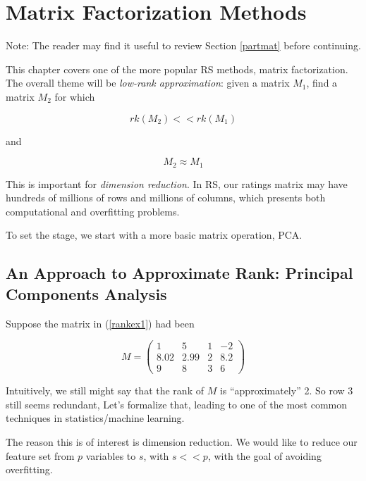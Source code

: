 
\chapter{Matrix Factorization Methods}   

Note:  The reader may find it useful to review Section \ref{partmat}
before continuing.

This chapter covers one of the more popular RS methods, matrix
factorization.  The overall theme will be \textit{low-rank
approximation}:  given a matrix $M_1$,  find a matrix $M_2$ for which 

\begin{equation}
rk(M_2) << rk(M_1)
\end{equation}

and 

\begin{equation}
M_2 \approx M_1
\end{equation}

This is important for \textit{dimension reduction}.  In RS, our
ratings matrix may have hundreds of millions of rows and millions of
columns, which presents both computational and overfitting problems.

To set the stage, we start with a more basic matrix operation, PCA.

\section{An Approach to Approximate Rank:  Principal Components
Analysis}

Suppose the matrix in (\ref{rankex1}) had been

\begin{equation}
\label{rankex2}  
M =
\left (
\begin{array}{rrrr}
1 & 5 & 1 & -2\\
8.02 & 2.99 & 2 & 8.2\\
9 & 8 & 3 & 6 
\end{array}
\right )
\end{equation}

Intuitively, we still might say that the rank of $M$ is
``approximately'' 2.  So row 3 still seems redundant, Let's
formalize that, leading to one of the most common techniques in
statistics/machine learning.  

The reason this is of interest is dimension reduction.  We would like to
reduce our feature set from $p$ variables to $s$, with $s << p$, with
the goal of avoiding overfitting.

